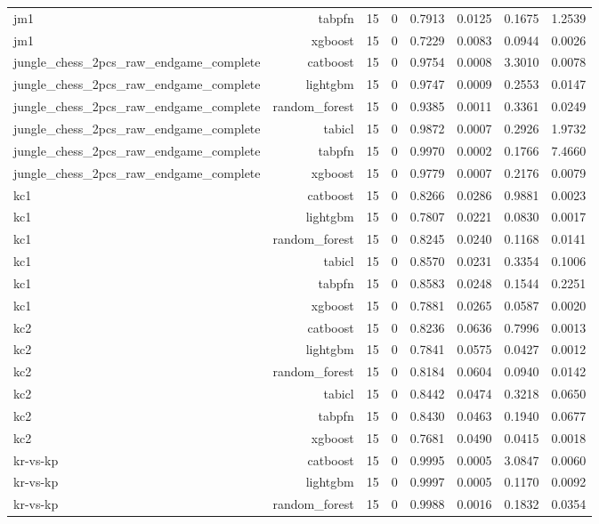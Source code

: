 \begin{table}[htbp]
\begin{tabular}{lrrrrrrr}
jm1 & tabpfn & 15 & 0 & 0.7913 & 0.0125 & 0.1675 & 1.2539 \\
jm1 & xgboost & 15 & 0 & 0.7229 & 0.0083 & 0.0944 & 0.0026 \\
jungle\_chess\_2pcs\_raw\_endgame\_complete & catboost & 15 & 0 & 0.9754 & 0.0008 & 3.3010 & 0.0078 \\
jungle\_chess\_2pcs\_raw\_endgame\_complete & lightgbm & 15 & 0 & 0.9747 & 0.0009 & 0.2553 & 0.0147 \\
jungle\_chess\_2pcs\_raw\_endgame\_complete & random\_forest & 15 & 0 & 0.9385 & 0.0011 & 0.3361 & 0.0249 \\
jungle\_chess\_2pcs\_raw\_endgame\_complete & tabicl & 15 & 0 & 0.9872 & 0.0007 & 0.2926 & 1.9732 \\
jungle\_chess\_2pcs\_raw\_endgame\_complete & tabpfn & 15 & 0 & 0.9970 & 0.0002 & 0.1766 & 7.4660 \\
jungle\_chess\_2pcs\_raw\_endgame\_complete & xgboost & 15 & 0 & 0.9779 & 0.0007 & 0.2176 & 0.0079 \\
kc1 & catboost & 15 & 0 & 0.8266 & 0.0286 & 0.9881 & 0.0023 \\
kc1 & lightgbm & 15 & 0 & 0.7807 & 0.0221 & 0.0830 & 0.0017 \\
kc1 & random\_forest & 15 & 0 & 0.8245 & 0.0240 & 0.1168 & 0.0141 \\
kc1 & tabicl & 15 & 0 & 0.8570 & 0.0231 & 0.3354 & 0.1006 \\
kc1 & tabpfn & 15 & 0 & 0.8583 & 0.0248 & 0.1544 & 0.2251 \\
kc1 & xgboost & 15 & 0 & 0.7881 & 0.0265 & 0.0587 & 0.0020 \\
kc2 & catboost & 15 & 0 & 0.8236 & 0.0636 & 0.7996 & 0.0013 \\
kc2 & lightgbm & 15 & 0 & 0.7841 & 0.0575 & 0.0427 & 0.0012 \\
kc2 & random\_forest & 15 & 0 & 0.8184 & 0.0604 & 0.0940 & 0.0142 \\
kc2 & tabicl & 15 & 0 & 0.8442 & 0.0474 & 0.3218 & 0.0650 \\
kc2 & tabpfn & 15 & 0 & 0.8430 & 0.0463 & 0.1940 & 0.0677 \\
kc2 & xgboost & 15 & 0 & 0.7681 & 0.0490 & 0.0415 & 0.0018 \\
kr-vs-kp & catboost & 15 & 0 & 0.9995 & 0.0005 & 3.0847 & 0.0060 \\
kr-vs-kp & lightgbm & 15 & 0 & 0.9997 & 0.0005 & 0.1170 & 0.0092 \\
kr-vs-kp & random\_forest & 15 & 0 & 0.9988 & 0.0016 & 0.1832 & 0.0354 \\

\end{tabular}
\end{table}
